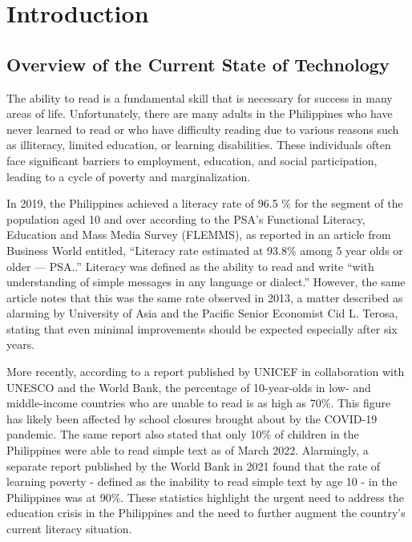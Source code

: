 \chapter{Introduction}
\label{sec:researchdesc}    %

\section{Overview of the Current State of Technology}
\label{sec:overview}

The ability to read is a fundamental skill that is necessary for success in many areas of life. Unfortunately, there are many adults in the Philippines who have never learned to read or who have difficulty reading due to various reasons such as illiteracy, limited education, or learning disabilities. These individuals often face significant barriers to employment, education, and social participation, leading to a cycle of poverty and marginalization.

In 2019, the Philippines achieved a literacy rate of 96.5 \% for the segment of the population aged 10 and over according to the PSA’s Functional Literacy, Education and Mass Media Survey (FLEMMS), as reported in an article from Business World entitled, “Literacy rate estimated at 93.8\% among 5 year olds or older — PSA..” Literacy was defined as the ability to read and write “with understanding of simple messages in any language or dialect.” However, the same article notes that this was the same rate observed in 2013, a matter described as alarming by University of Asia and the Pacific Senior Economist Cid L. Terosa, stating that even minimal improvements should be expected especially after six years.

More recently, according to a report published by UNICEF in collaboration with UNESCO and the World Bank, the percentage of 10-year-olds in low- and middle-income countries who are unable to read is as high as 70\%. This figure has likely been affected by school closures brought about by the COVID-19 pandemic. The same report also stated that only 10\% of children in the Philippines were able to read simple text as of March 2022. Alarmingly, a separate report published by the World Bank in 2021 found that the rate of learning poverty - defined as the inability to read simple text by age 10 - in the Philippines was at 90\%. These statistics highlight the urgent need to address the education crisis in the Philippines and the need to further augment the country’s current literacy situation.

